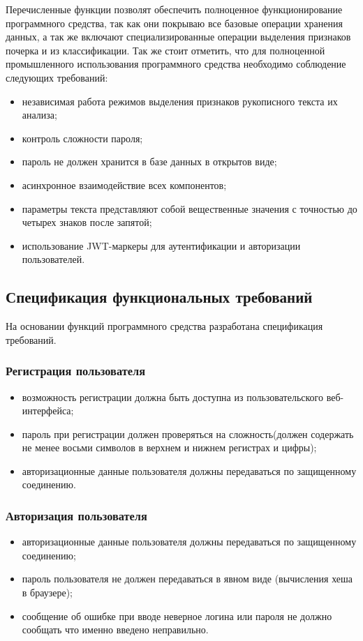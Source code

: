 Перечисленные функции позволят обеспечить полноценное функционирование программного средства, так как они покрываю все базовые операции хранения данных, а так же включают специализированные операции выделения признаков почерка и из классификации. Так же стоит отметить, что для полноценной промышленного использования программного средства необходимо соблюдение следующих требований:
\begin{itemize}
  \item независимая работа режимов выделения признаков рукописного текста их анализа;
  \item контроль сложности пароля;
  \item пароль не должен хранится в базе данных в открытов виде;
  \item асинхронное взаимодействие всех компонентов;
  \item параметры текста представляют собой вещественные значения с точностью до четырех знаков после запятой;
  \item использование JWT-маркеры для аутентификации и авторизации пользователей.
\end{itemize}

\subsection{Спецификация функциональных требований}
На основании функций программного средства разработана спецификация требований. 
\subsubsection{Регистрация пользователя}
\label{sec:freq:reg}
\begin{itemize}
	\item возможность регистрации должна быть доступна из пользовательского веб-интерфейса;
	\item пароль при регистрации должен проверяться на сложность(должен содержать не менее восьми символов в верхнем и нижнем регистрах и \mbox{цифры);}
	\item авторизационные данные пользователя должны передаваться по защищенному соединению.
\end{itemize}

\subsubsection{Авторизация пользователя}
\label{sec:freq:auth}
\begin{itemize}
	\item авторизационные данные пользователя должны передаваться по защищенному соединению;
	\item пароль пользователя не должен передаваться в явном виде (вычисления хеша в браузере);
 	\item сообщение об ошибке при вводе неверное логина или пароля не должно сообщать что именно введено неправильно.
\end{itemize}

